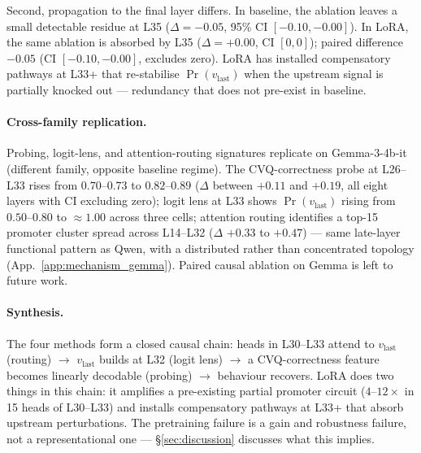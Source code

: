 \documentclass[11pt]{article}
\begin{document}
Second, propagation to the final layer differs. In baseline, the
ablation leaves a small detectable residue at L35
($\Delta {=} {-}0.05$, 95\% CI $[-0.10, -0.00]$). In LoRA, the
same ablation is absorbed by L35 ($\Delta {=} {+}0.00$, CI
$[0, 0]$); paired difference $-0.05$ (CI $[-0.10, -0.00]$,
excludes zero). LoRA has installed compensatory pathways at L33+
that re-stabilise $\Pr(v_{\text{last}})$ when the upstream signal
is partially knocked out --- redundancy that does not pre-exist in
baseline.

\paragraph{Cross-family replication.}
Probing, logit-lens, and attention-routing signatures replicate on
Gemma-3-4b-it (different family, opposite baseline regime). The
CVQ-correctness probe at L26--L33 rises from $0.70$--$0.73$ to
$0.82$--$0.89$ ($\Delta$ between $+0.11$ and $+0.19$, all eight
layers with CI excluding zero); logit lens at L33 shows
$\Pr(v_{\text{last}})$ rising from $0.50$--$0.80$ to $\approx 1.00$
across three cells; attention routing identifies a top-15
promoter cluster spread across L14--L32 ($\Delta$ $+0.33$ to
$+0.47$) --- same late-layer functional pattern as Qwen, with a
distributed rather than concentrated topology
(App.~\ref{app:mechanism_gemma}). Paired causal ablation on Gemma
is left to future work.

\paragraph{Synthesis.}
The four methods form a closed causal chain: heads in L30--L33
attend to $v_{\text{last}}$ (routing) $\to$ $v_{\text{last}}$
builds at L32 (logit lens) $\to$ a CVQ-correctness feature becomes
linearly decodable (probing) $\to$ behaviour recovers. LoRA does
two things in this chain: it amplifies a pre-existing partial
promoter circuit ($4$--$12\times$ in 15 heads of L30--L33) and
installs compensatory pathways at L33+ that absorb upstream
perturbations. The pretraining failure is a gain and robustness
failure, not a representational one --- \S\ref{sec:discussion}
discusses what this implies.

\begin{table}[t]
\centering
\small

\caption{Bootstrap 95\% CIs on key mechanistic $\Delta$s at
L30--L33, baseline vs +LoRA. Probing and attention-routing rows
aggregate within the band; logit-lens rows give
$\Pr(v_{\text{last}})$ at L32. Trial counts: probing 200 trials at
$K{=}2, N{=}5$; logit lens 100 trials per cell; attention routing
50 trials at $K{=}2, N{=}30$. Bootstrap $n_{\text{boot}}{=}2000$,
seed 17.}
\label{tab:mechanism}
\end{table}
\end{document}
